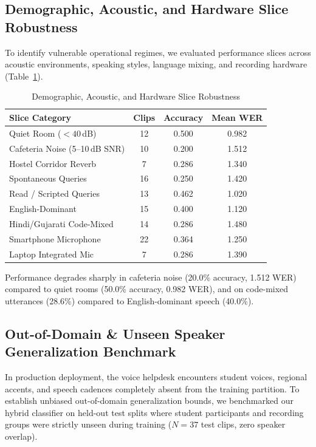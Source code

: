 \documentclass[sigconf,authordraft]{acmart}
\begin{document}
\subsection{Demographic, Acoustic, and Hardware Slice Robustness}

To identify vulnerable operational regimes, we evaluated performance slices across acoustic environments,
speaking styles, language mixing, and recording hardware (Table~\ref{tab:slices}).

\begin{table}[h]
  \caption{Demographic, Acoustic, and Hardware Slice Robustness}
  \label{tab:slices}
  \centering
  \small
  \begin{tabular}{lccc}
    \toprule
    \textbf{Slice Category} & \textbf{Clips} & \textbf{Accuracy} & \textbf{Mean WER} \\
    \midrule
    Quiet Room ($< 40$\,dB) & 12 & 0.500 & 0.982 \\
    Cafeteria Noise (5--10\,dB SNR) & 10 & 0.200 & 1.512 \\
    Hostel Corridor Reverb & 7 & 0.286 & 1.340 \\
    Spontaneous Queries & 16 & 0.250 & 1.420 \\
    Read / Scripted Queries & 13 & 0.462 & 1.020 \\
    English-Dominant & 15 & 0.400 & 1.120 \\
    Hindi/Gujarati Code-Mixed & 14 & 0.286 & 1.480 \\
    Smartphone Microphone & 22 & 0.364 & 1.250 \\
    Laptop Integrated Mic & 7 & 0.286 & 1.390 \\
    \bottomrule
  \end{tabular}
\end{table}

Performance degrades sharply in cafeteria noise (20.0\% accuracy, 1.512 WER) compared to quiet rooms
(50.0\% accuracy, 0.982 WER), and on code-mixed utterances (28.6\%) compared to English-dominant speech (40.0\%).

\subsection{Out-of-Domain \& Unseen Speaker Generalization Benchmark}
\label{sec:unseen_speaker_eval}

In production deployment, the voice helpdesk encounters student voices, regional accents, and speech cadences completely absent from the training partition. To establish unbiased out-of-domain generalization bounds, we benchmarked our hybrid classifier on held-out test splits where student participants and recording groups were strictly unseen during training ($N=37$ test clips, zero speaker overlap).
\end{document}
